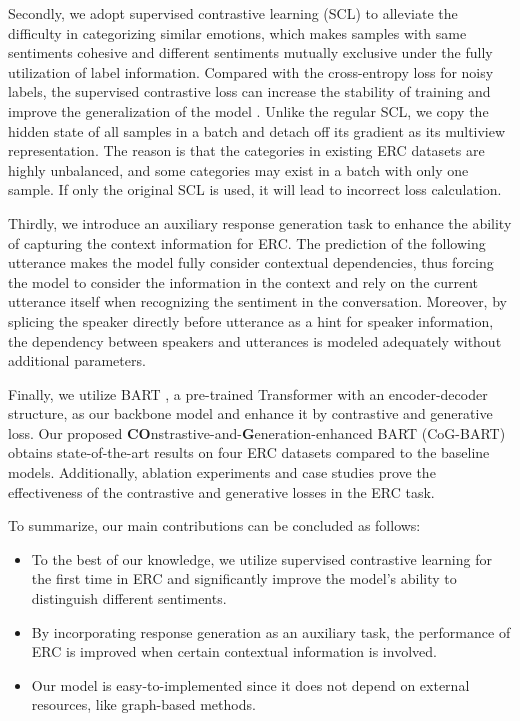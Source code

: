 \documentclass[letterpaper]{article} \usepackage{aaai22}  \usepackage{times}  \usepackage{helvet}  \usepackage{courier}  \usepackage[hyphens]{url}  \usepackage{graphicx} \urlstyle{rm} \def\UrlFont{\rm}  \usepackage{natbib}  \usepackage{caption} \DeclareCaptionStyle{ruled}{labelfont=normalfont,labelsep=colon,strut=off} \frenchspacing  \setlength{\pdfpagewidth}{8.5in}  \setlength{\pdfpageheight}{11in}  \usepackage{algorithm}
\begin{document}
Secondly, we adopt supervised contrastive learning (SCL) \cite{khosla2020supervisedcl} to alleviate the difficulty in categorizing similar emotions, which makes samples with same sentiments cohesive and different sentiments mutually exclusive under the fully utilization of label information. Compared with the cross-entropy loss for noisy labels, the supervised contrastive loss can increase the stability of training and improve the generalization of the model \cite{scl-fine-tune}. Unlike the regular SCL, we copy the hidden state of all samples in a batch and detach off its gradient as its multiview representation. The reason is that the categories in existing ERC datasets are highly unbalanced, and some categories may exist in a batch with only one sample. If only the original SCL is used, it will lead to incorrect loss calculation.

Thirdly, we introduce an auxiliary response  generation task to enhance the ability of capturing the context information for ERC. The prediction of the following utterance makes the model fully consider contextual dependencies, thus forcing the model to consider the information in the context and rely on the current utterance itself when recognizing the sentiment in the conversation. Moreover, by splicing the speaker directly before utterance as a hint for speaker information, the dependency between speakers and utterances is modeled adequately without additional parameters.


Finally, we utilize BART \cite{lewis-etal-2020-bart}, a pre-trained Transformer with an encoder-decoder structure, as our backbone model and enhance it by contrastive and generative loss. Our proposed \textbf{CO}nstrastive-and-\textbf{G}eneration-enhanced BART (CoG-BART) obtains state-of-the-art results on four ERC datasets compared to the baseline models. Additionally, ablation experiments and case studies prove the effectiveness of the contrastive and generative losses in the ERC task.

To summarize, our main contributions can be concluded as follows:
\begin{itemize}
\item To the best of our knowledge, we utilize supervised contrastive learning for the first time in ERC and significantly improve the model's ability to distinguish different sentiments.
\item By incorporating response generation as an auxiliary task, the performance of ERC is improved when certain contextual information is involved.
\item Our model is easy-to-implemented since it does not depend on external resources, like graph-based methods.
\end{itemize}
\end{document}
